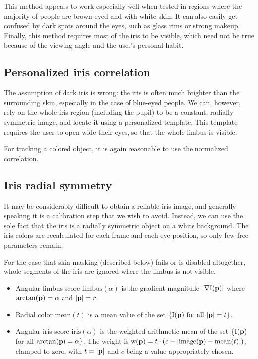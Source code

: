 This method appears to work especially well when tested in regions where the majority of people are brown-eyed and with white skin.
It can also easily get confused by dark spots around the eyes, such as glass rims or strong makeup.
Finally, this method requires most of the iris to be visible, which need not be true because of the viewing angle and the user's personal habit.

\subsection{Personalized iris correlation}
The assumption of dark iris is wrong: the iris is often much brighter than the surrounding skin, especially in the case of blue-eyed people.
We can, however, rely on the whole iris region (including the pupil) to be a constant, radially symmetric image, and locate it using a personalized template.
This template requires the user to open wide their eyes, so that the whole limbus is visible.

For tracking a colored object, it is again reasonable to use the normalized correlation.


\subsection{Iris radial symmetry}

It may be considerably difficult to obtain a reliable iris image, and generally speaking it is a calibration step that we wish to avoid.
Instead, we can use the sole fact that the iris is a radially symmetric object on a white background.
The iris colors are recalculated for each frame and each eye position, so only few free parameters remain.

For the case that skin masking (described below) fails or is disabled altogether, whole segments of the iris are ignored where the limbus is not visible.

\begin{itemize}
\item
Angular limbus score $\textrm{limbus}(\alpha)$ is the gradient magnitude $|\nabla \textrm{I}(\mathbf{p})|$ where $\arctan(\mathbf{p}) = \alpha$ and $|\mathbf{p}| = r$.

\item
Radial color $\textrm{mean}(t)$ is a mean value of the set $\{\textrm{I}(\mathbf{p}) \text{ for all } |\mathbf{p}| = t \}$.

\item
Angular iris score $\textrm{iris}(\alpha)$ is the weighted arithmetic mean of the set $\{\textrm{I}(\mathbf{p})$ for all $\arctan(\mathbf{p}) = \alpha \}$.
The weight is $\textrm{w}(\mathbf{p}) = t \cdot (c - |\textrm{image}(\mathbf{p}) - \textrm{mean}(t)|)$, clamped to zero, with $t = |\mathbf{p}|$ and $c$ being a value appropriately chosen.

\end{itemize}

